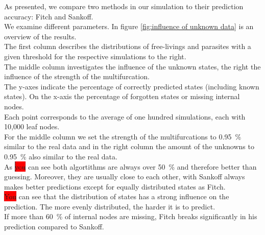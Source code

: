     As presented, we compare two methods in our simulation to their prediction accuracy: Fitch and 
      Sankoff. \\
    We examine different parameters. In figure \ref{fig:influence of unknown data} is an overview of 
      the results. \\
    The first column describes the distributions of free-livings and parasites with a given threshold 
      for the respective simulations to the right. \\
    The middle column investigates the influence of the unknown states, the right the influence of the 
      strength of the multifurcation. \\
    The y-axes indicate the percentage of correctly predicted states (including known states). On the 
      x-axis the percentage of forgotten states or missing internal nodes. \\
    Each point corresponds to the average of one hundred simulations, each with 10,000 leaf nodes. \\
    For the middle column we set the strength of the multifurcations to 0.95~\% similar to the real 
      data and in the right column the amount of the unknowns to 0.95~\% also similar to the real data. \\

    As \colorbox{red}{you} can see both algortithms are always over 50~\% and therefore better than guessing. Moreover, 
      they are usually close to each other, with Sankoff always makes better predictions except for 
      equally distributed states as Fitch. \\
    \colorbox{red}{You} can see that the distribution of states has a strong influence on the prediction. The more 
      evenly distributed, the harder it is to predict. \\
    If more than 60~\% of internal nodes are missing, Fitch breaks significantly in his prediction 
      compared to Sankoff.
    
